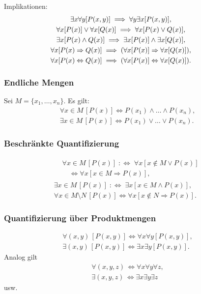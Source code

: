 Implikationen:
\begin{gather}
\hspace{-2em}\exists x\forall y[P(x,y)]\implies \forall y\exists x[P(x,y)],\\
\hspace{-2em}\forall x[P(x)]\lor\forall x[Q(x)]\implies\forall x[P(x)\lor Q(x)],\\
\hspace{-2em}\exists x[P(x)\land Q(x)]\implies
  \exists x[P(x)]\land \exists x[Q(x)],\\
\hspace{-2em}\forall x[P(x)\Rightarrow Q(x)]\implies
  (\forall x[P(x)]\Rightarrow\forall x[Q(x)]),\\
\hspace{-2em}\forall x[P(x)\Leftrightarrow Q(x)]\implies
  (\forall x[P(x)]\Leftrightarrow\forall x[Q(x)]).
\end{gather}

\subsubsection{Endliche Mengen}
Sei $M=\{x_1,\ldots,x_n\}$. Es gilt:
\begin{gather}
\forall x{\in}M\,[P(x)]\iff P(x_1)\land\ldots\land P(x_n),\\
\exists x{\in}M\,[P(x)]\iff P(x_1)\lor\ldots\lor P(x_n).
\end{gather}

\subsubsection{Beschränkte Quantifizierung}
\begin{gather}
\begin{split}
& \forall x{\in}M\,[P(x)]\;:\Longleftrightarrow\;\forall x[x\notin M\lor P(x)]\\
& \quad\iff\forall x[x\in M\Rightarrow P(x)],
\end{split}\\
\exists x{\in}M\,[P(x)]\;:\Longleftrightarrow\;\exists x[x\in M\land P(x)],\\
\forall x{\in}M{\setminus}N\,[P(x)]\iff \forall x[x\notin N\Rightarrow P(x)].
\end{gather}

\subsubsection{Quantifizierung über Produktmengen}
\begin{gather}
\forall(x,y)\,[P(x,y)]\iff \forall x\forall y[P(x,y)],\\
\exists(x,y)\,[P(x,y)]\iff \exists x\exists y[P(x,y)].
\end{gather}
Analog gilt
\begin{gather}
\forall(x,y,z)\,\iff \forall x\forall y\forall z,\\
\exists(x,y,z)\,\iff \exists x\exists y\exists z
\end{gather}
usw.

